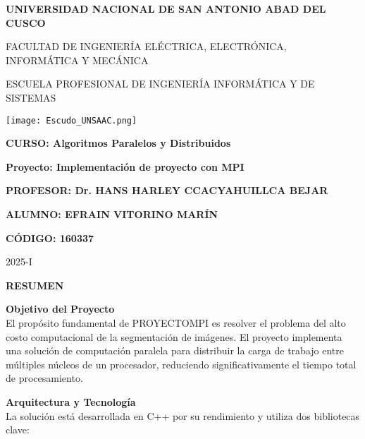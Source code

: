 \documentclass[fleqn,10pt]{article}
\begin{document}
\begin{titlepage}
    \centering
    \vspace*{1cm}
    {\LARGE\bfseries UNIVERSIDAD NACIONAL DE SAN ANTONIO ABAD DEL CUSCO\par}
    \vspace{0.5cm}
    {\Large FACULTAD DE INGENIERÍA ELÉCTRICA, ELECTRÓNICA, INFORMÁTICA Y MECÁNICA\par}
    \vspace{0.5cm}
    {\Large ESCUELA PROFESIONAL DE INGENIERÍA INFORMÁTICA Y DE SISTEMAS\par}
    \vfill
    \texttt{[image: Escudo\_UNSAAC.png]}\par
    \vfill
    {\Large\bfseries CURSO: Algoritmos Paralelos y Distribuidos\par}
    \vspace{0.3cm}
    {\Large\bfseries Proyecto: Implementación de proyecto con MPI\par}
    \vspace{0.3cm}
    {\Large\bfseries PROFESOR: Dr. HANS HARLEY CCACYAHUILLCA BEJAR\par}
    \vspace{1cm}
    {\Large\bfseries ALUMNO: EFRAIN VITORINO MARÍN\par}
    {\Large\bfseries CÓDIGO: 160337\par}
    \vfill
    {\Large 2025-I\par}
\end{titlepage}

\setcounter{page}{1}
\pagestyle{plain}

\begin{center}
    \Large\bfseries RESUMEN
\end{center}
\vspace{0.5cm}

\noindent\textbf{Objetivo del Proyecto}\\
El propósito fundamental de PROYECTOMPI es resolver el problema del alto costo computacional de la segmentación de imágenes. El proyecto implementa una solución de computación paralela para distribuir la carga de trabajo entre múltiples núcleos de un procesador, reduciendo significativamente el tiempo total de procesamiento.

\vspace{0.5cm}
\noindent\textbf{Arquitectura y Tecnología}\\
La solución está desarrollada en C++ por su rendimiento y utiliza dos bibliotecas clave:
\end{document}
